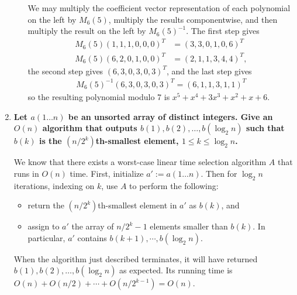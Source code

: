 \documentclass[a4paper,12pt]{article}
\begin{document}
\begin{enumerate}
\begin{enumerate}
                    We may multiply the coefficient vector representation of each polynomial on the left by $M_6(5)$, multiply the results componentwise, and then multiply the result on the left by $M_6(5)^{-1}$. The first step gives
                    \begin{align*}
                        M_6(5) (1, 1, 1, 0, 0, 0)^T &= (3, 3, 0, 1, 0, 6)^T \\
                        M_6(5) (6, 2, 0, 1, 0, 0)^T &= (2, 1, 1, 3, 4, 4)^T,
                    \end{align*}
                    the second step gives $(6, 3, 0, 3, 0, 3)^T$, and the last step gives
                    \begin{align*}
                        M_6(5)^{-1} (6, 3, 0, 3, 0, 3)^T = (6, 1, 1, 3, 1, 1)^T
                    \end{align*}
                    so the resulting polynomial modulo 7 is $x^5 + x^4 + 3x^3 + x^2 + x + 6$.
            \end{enumerate}

    \item
        \boldmath\textbf{Let $a(1 \dots n)$ be an unsorted array of distinct integers. Give an $O(n)$ algorithm that outputs $b(1), b(2), \dots, b(\log_2 n)$ such that $b(k)$ is the $(n/2^k)$th-smallest element, $1 \leq k \leq \log_2 n$.
        }\unboldmath \par
        We know that there exists a worst-case linear time selection algorithm $A$ that runs in $O(n)$ time. First, initialize $a' := a(1 \dots n)$. Then for $\log_2 n$ iterations, indexing on $k$, use $A$ to perform the following:
        \begin{itemize}
            \item
                return the $(n/2^k)$th-smallest element in $a'$ as $b(k)$, and
            \item
                assign to $a'$ the array of $n/2^k - 1$ elements smaller than $b(k)$. In particular, $a'$ contains $b(k + 1), \cdots, b(\log_2 n)$.
        \end{itemize}
        When the algorithm just described terminates, it will have returned $b(1), b(2), \dots, b(\log_2 n)$ as expected. Its running time is $O(n) + O(n/2) + \cdots + O(n/2^{k - 1}) = O(n)$.
\end{enumerate}
\end{document}

